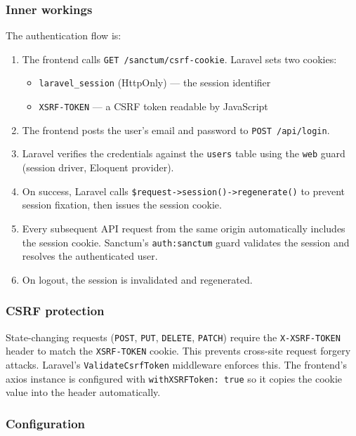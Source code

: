 \documentclass[11pt,a4paper]{article}
\begin{document}
\subsubsection{Inner workings}

The authentication flow is:

\begin{enumerate}[leftmargin=*]
    \item The frontend calls \texttt{GET /sanctum/csrf-cookie}. Laravel sets two cookies:
          \begin{itemize}
              \item \texttt{laravel\_session} (HttpOnly) --- the session identifier
              \item \texttt{XSRF-TOKEN} --- a CSRF token readable by JavaScript
          \end{itemize}
    \item The frontend posts the user's email and password to \texttt{POST /api/login}.
    \item Laravel verifies the credentials against the \texttt{users} table using the \texttt{web} guard (session driver, Eloquent provider).
    \item On success, Laravel calls \texttt{\$request->session()->regenerate()} to prevent session fixation, then issues the session cookie.
    \item Every subsequent API request from the same origin automatically includes the session cookie. Sanctum's \texttt{auth:sanctum} guard validates the session and resolves the authenticated user.
    \item On logout, the session is invalidated and regenerated.
\end{enumerate}

\subsubsection{CSRF protection}

State-changing requests (\texttt{POST}, \texttt{PUT}, \texttt{DELETE}, \texttt{PATCH}) require the \texttt{X-XSRF-TOKEN} header to match the \texttt{XSRF-TOKEN} cookie. This prevents cross-site request forgery attacks. Laravel's \texttt{ValidateCsrfToken} middleware enforces this. The frontend's axios instance is configured with \texttt{withXSRFToken: true} so it copies the cookie value into the header automatically.

\subsubsection{Configuration}
\end{document}
